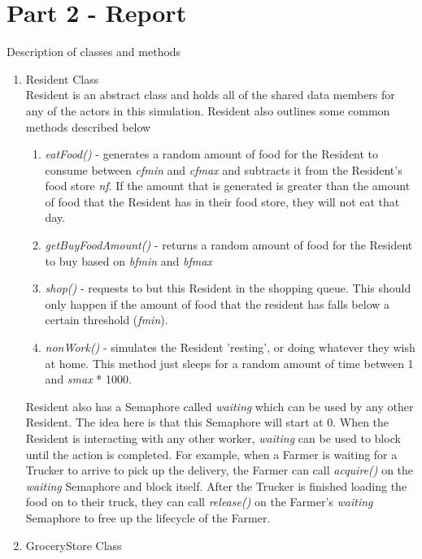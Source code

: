 \documentclass[12pt]{article}
\begin{document}
        
    \section{Part 2 - Report}
        Description of classes and methods
        \begin{enumerate}
            \item Resident Class \\
                Resident is an abstract class and holds all of the shared data members for any of the actors in this simulation. Resident also outlines some common methods described below
                \begin{enumerate}
                    \item \textit{eatFood()} - generates a random amount of food for the Resident to consume between \textit{cfmin} and \textit{cfmax} and subtracts it from the Resident's food store \textit{nf}. If the amount that is generated is greater than the amount of food that the Resident has in their food store, they will not eat that day.
                    \item \textit{getBuyFoodAmount()} - returns a random amount of food for the Resident to buy based on \textit{bfmin} and \textit{bfmax} \\
                    \item \textit{shop()} - requests to but this Resident in the shopping queue. This should only happen if the amount of food that the resident has falls below a certain threshold (\textit{fmin}). 
                    \item \textit{nonWork()} - simulates the Resident 'resting', or doing whatever they wish at home. This method just sleeps for a random amount of time between 1 and \textit{smax} * 1000.
                \end{enumerate}
                Resident also has a Semaphore called \textit{waiting} which can be used by any other Resident. The idea here is that this Semaphore will start at 0. When the Resident is interacting with any other worker, \textit{waiting} can be used to block until the action is completed. For example, when a Farmer is waiting for a Trucker to arrive to pick up the delivery, the Farmer can call \textit{acquire()} on the \textit{waiting} Semaphore and block itself. After the Trucker is finished loading the food on to their truck, they can call \textit{release()} on the Farmer's \textit{waiting} Semaphore to free up the lifecycle of the Farmer.
            \item GroceryStore Class \\

\end{enumerate}
\end{document}
